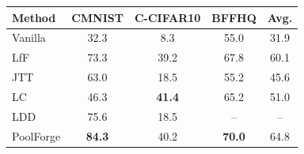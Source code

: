 \begin{tabular}{lcccc}
\toprule
Method & CMNIST & C-CIFAR10 & BFFHQ & Avg. \\
\midrule
Vanilla & 32.3 & 8.3 & 55.0 & 31.9 \\
LfF & 73.3 & 39.2 & 67.8 & 60.1 \\
JTT & 63.0 & 18.5 & 55.2 & 45.6 \\
LC & 46.3 & \textbf{41.4} & 65.2 & 51.0 \\
LDD & 75.6 & 18.5 & -- & -- \\
\rowcolor{ours}PoolForge & \textbf{84.3} & 40.2 & \textbf{70.0} & 64.8 \\
\bottomrule
\end{tabular}
